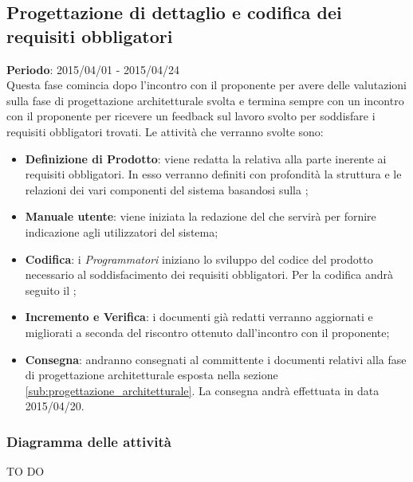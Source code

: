 	\subsection{Progettazione di dettaglio e codifica dei requisiti obbligatori} %
	\label{sub:progettazione_di_dettaglio_e_codifica_dei_requisiti_obbligatori}
	\textbf{Periodo}:  2015/04/01 - 2015/04/24 \\
	Questa fase comincia dopo l'incontro con il proponente per avere delle valutazioni sulla fase di progettazione architetturale svolta e termina sempre con un incontro con il proponente per ricevere un feedback sul lavoro svolto per soddisfare i requisiti obbligatori trovati.
	Le attività che verranno svolte sono:
		\begin{itemize}
			\item \textbf{Definizione di Prodotto}: viene redatta la \docNameVersionDdP{} relativa alla parte inerente ai requisiti obbligatori. In esso verranno definiti con profondità la struttura e le relazioni dei vari componenti del sistema basandosi sulla \docNameVersionST;
			\item \textbf{Manuale utente}: viene iniziata la redazione del \docNameVersionMU{} che servirà per fornire indicazione agli utilizzatori del sistema;
			\item \textbf{Codifica}: i \emph{Programmatori} iniziano lo sviluppo del codice del prodotto necessario al soddisfacimento dei requisiti obbligatori. Per la codifica andrà seguito il \docNameVersionDdP;
			\item \textbf{Incremento e Verifica}: i documenti già redatti verranno aggiornati e migliorati a seconda del riscontro ottenuto dall'incontro con il proponente;
			\item \textbf{Consegna}: andranno consegnati al committente i documenti relativi alla fase di progettazione architetturale esposta nella sezione \ref{sub:progettazione_architetturale}. La consegna andrà effettuata in data 2015/04/20.
		\end{itemize}
		
		\subsubsection{Diagramma delle attività} %
		\label{ssub:diagramma_delle_attivita}
		TO DO
	
